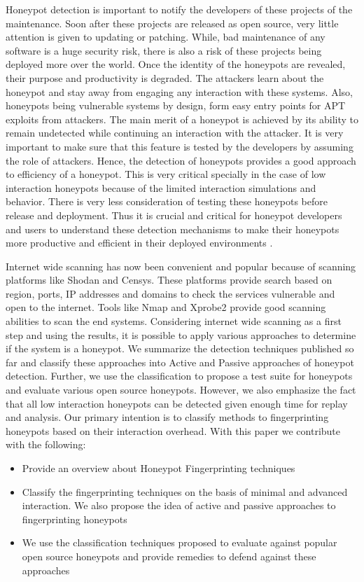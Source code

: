 \documentclass[letterpaper, 10 pt, conference]{ieeeconf}  %
\begin{document}
Honeypot detection is important to notify the developers of these projects of the maintenance. Soon after these projects are released as open source, very little attention is given to updating or patching. While, bad maintenance of any software is a huge security risk, there is also a risk of these projects being deployed more over the world. Once the identity of the honeypots are revealed, their purpose and productivity is degraded. The attackers learn about the honeypot and stay away from engaging any interaction with these systems. Also, honeypots being vulnerable systems by design, form easy entry points for APT exploits from attackers. The main merit of a honeypot is achieved by its ability to remain undetected while continuing an interaction with the attacker. It is very important to make sure that this feature is tested by the developers by assuming the role of attackers. Hence, the detection of honeypots provides a good approach to efficiency of a honeypot. This is very critical specially in the case of low interaction honeypots because of the limited interaction simulations and behavior. There is very less consideration of testing these honeypots before release and deployment. Thus it is crucial and critical for honeypot developers and users to understand these detection mechanisms to make their honeypots more productive and efficient in their deployed environments . 


Internet wide scanning has now been convenient and popular because of scanning platforms like Shodan and Censys. These platforms provide search based on region, ports, IP addresses and domains to check the services vulnerable and  open to the internet. Tools like Nmap \cite{NMap} and Xprobe2 provide good scanning abilities to scan the end systems. Considering internet wide scanning as a first step and using the results, it is possible to apply various approaches to determine if the system is a honeypot. We summarize the detection techniques published so far and classify these approaches into Active and Passive approaches of honeypot detection. Further, we use the classification to propose a test suite for honeypots and evaluate various open source honeypots. However, we also emphasize the fact that all low interaction honeypots can be detected given enough time for replay and analysis. Our primary intention is to classify methods to fingerprinting honeypots based on their interaction overhead. With this paper we contribute with the following:

 \begin{itemize}
    \item Provide an overview about Honeypot Fingerprinting techniques
    \item Classify the fingerprinting techniques on the basis of minimal and advanced interaction. We also propose the idea of active and passive approaches to fingerprinting honeypots
    \item We use the classification techniques proposed to evaluate against popular open source honeypots and provide remedies to defend against these approaches 
 \end{itemize}
\end{document}
